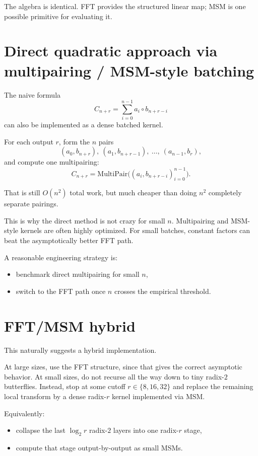 \documentclass[11pt]{article}
\begin{document}
The algebra is identical. FFT provides the structured linear map; MSM is one possible primitive for evaluating it.

\section{Direct quadratic approach via multipairing / MSM-style batching}

The naive formula
\[
C_{n+r} = \sum_{i=0}^{n-1} a_i \circ b_{n+r-i}
\]
can also be implemented as a dense batched kernel.

For each output $r$, form the $n$ pairs
\[
(a_0,b_{n+r}),\ (a_1,b_{n+r-1}),\ \dots,\ (a_{n-1},b_r),
\]
and compute one multipairing:
\[
C_{n+r} = \mathrm{MultiPair}\big((a_i,b_{n+r-i})_{i=0}^{n-1}\big).
\]

That is still $O(n^2)$ total work, but much cheaper than doing $n^2$ completely separate pairings.

This is why the direct method is not crazy for small $n$. Multipairing and MSM-style kernels are often highly optimized. For small batches, constant factors can beat the asymptotically better FFT path.

A reasonable engineering strategy is:
\begin{itemize}[itemsep=0.3em, topsep=0.4em]
  \item benchmark direct multipairing for small $n$,
  \item switch to the FFT path once $n$ crosses the empirical threshold.
\end{itemize}

\section{FFT/MSM hybrid}

This naturally suggests a hybrid implementation.

At large sizes, use the FFT structure, since that gives the correct asymptotic behavior. At small sizes, do not recurse all the way down to tiny radix-$2$ butterflies. Instead, stop at some cutoff $r \in \{8,16,32\}$ and replace the remaining local transform by a dense radix-$r$ kernel implemented via MSM.

Equivalently:
\begin{itemize}[itemsep=0.3em, topsep=0.4em]
  \item collapse the last $\log_2 r$ radix-$2$ layers into one radix-$r$ stage,
  \item compute that stage output-by-output as small MSMs.
\end{itemize}
\end{document}
